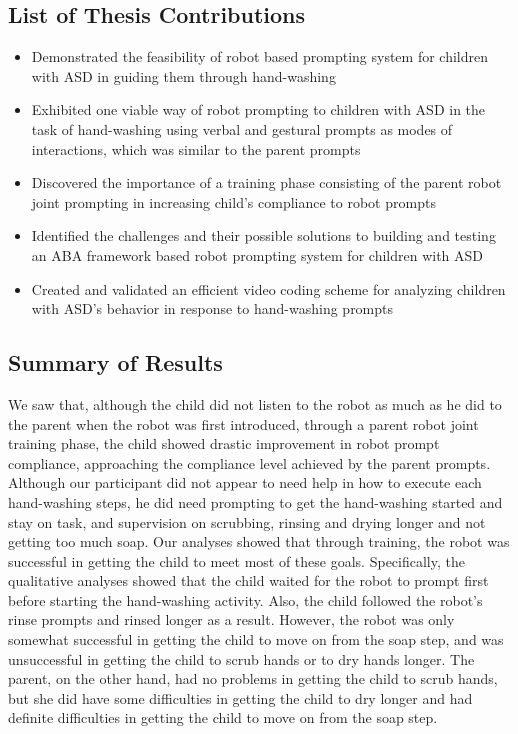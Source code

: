 \documentclass{ut-thesis}
\begin{document}
\subsection{List of Thesis Contributions}
\begin{itemize}
	\item Demonstrated the feasibility of robot based prompting system for children with ASD in guiding them through hand-washing
	\item Exhibited one viable way of robot prompting to children with ASD in the task of hand-washing using verbal and gestural prompts as modes of interactions, which was similar to the parent prompts
	\item Discovered the importance of a training phase consisting of the parent robot joint prompting in increasing child's compliance to robot prompts
	\item Identified the challenges and their possible solutions to building and testing an ABA framework based robot prompting system for children with ASD
	\item Created and validated an efficient video coding scheme for analyzing children with ASD's behavior in response to hand-washing prompts
\end{itemize}	


\subsection{Summary of Results}
We saw that, although the child did not listen to the robot as much as he did to the parent when the robot was first introduced, through a parent robot joint training phase, the child showed drastic improvement in robot prompt compliance, approaching the compliance level achieved by the parent prompts.  Although our participant did not appear to need help in how to execute each hand-washing steps, he did need prompting to get the hand-washing started and stay on task, and supervision on scrubbing, rinsing and drying longer and not getting too much soap.  Our analyses showed that through training, the robot was successful in getting the child to meet most of these goals.  Specifically, the qualitative analyses showed that the child waited for the robot to prompt first before starting the hand-washing activity.  Also, the child followed the robot's rinse prompts and rinsed longer as a result.  However, the robot was only somewhat successful in getting the child to move on from the soap step, and was unsuccessful in getting the child to scrub hands or to dry hands longer.  The parent, on the other hand, had no problems in getting the child to scrub hands, but she did have some difficulties in getting the child to dry longer and had definite difficulties in getting the child to move on from the soap step.
\end{document}
